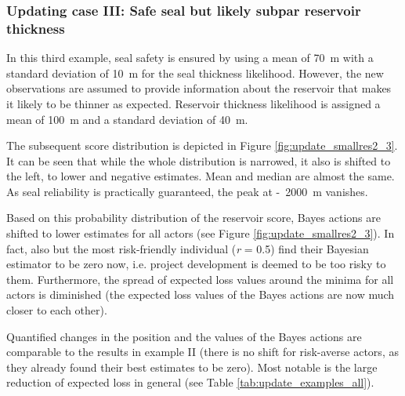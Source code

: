 				
				\subsubsection{Updating case III: Safe seal but likely subpar reservoir thickness}
				In this third example, seal safety is ensured by using a mean of 70~m with a standard deviation of 10~m for the seal thickness likelihood. However, the new observations are assumed to provide information about the reservoir that makes it likely to be thinner as expected. Reservoir thickness likelihood is assigned a mean of 100~m and a standard deviation of 40~m. 
				
				The subsequent score distribution is depicted in Figure \ref{fig:update_smallres2_3}. It can be seen that while the whole distribution is narrowed, it also is shifted to the left, to lower and negative estimates. Mean and median are almost the same. As seal reliability is practically guaranteed, the peak at -~2000~m vanishes. 
				
				Based on this probability distribution of the reservoir score, Bayes actions are shifted to lower estimates for all actors (see Figure \ref{fig:update_smallres2_3}). In fact, also but the most risk-friendly individual (\textit{r} = 0.5) find their Bayesian estimator to be zero now, i.e. project development is deemed to be too risky to them. Furthermore, the spread of expected loss values around the minima for all actors is diminished (the expected loss values of the Bayes actions are now much closer to each other).
				
				Quantified changes in the position and the values of the Bayes actions are comparable to the results in example II (there is no shift for risk-averse actors, as they already found their best estimates to be zero). Most notable is the large reduction of expected loss in general (see Table \ref{tab:update_examples_all}).	
				
